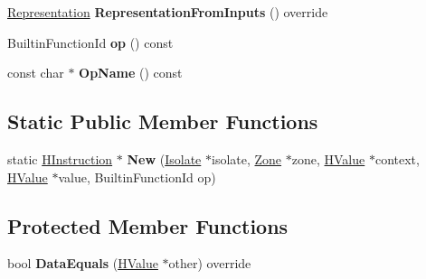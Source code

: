 \begin{DoxyCompactItemize}
\item 
\hyperlink{classv8_1_1internal_1_1_representation}{Representation} {\bfseries Representation\+From\+Inputs} () override\hypertarget{classv8_1_1internal_1_1_h_unary_math_operation_a20d328b4b4449db1e57954efd9edc82b}{}\label{classv8_1_1internal_1_1_h_unary_math_operation_a20d328b4b4449db1e57954efd9edc82b}

\item 
Builtin\+Function\+Id {\bfseries op} () const \hypertarget{classv8_1_1internal_1_1_h_unary_math_operation_ade72a1e96b97be6da0dbab211d5f1c6a}{}\label{classv8_1_1internal_1_1_h_unary_math_operation_ade72a1e96b97be6da0dbab211d5f1c6a}

\item 
const char $\ast$ {\bfseries Op\+Name} () const \hypertarget{classv8_1_1internal_1_1_h_unary_math_operation_a6c257ee25ce97e3b6ea9678a14b773f4}{}\label{classv8_1_1internal_1_1_h_unary_math_operation_a6c257ee25ce97e3b6ea9678a14b773f4}

\end{DoxyCompactItemize}
\subsection*{Static Public Member Functions}
\begin{DoxyCompactItemize}
\item 
static \hyperlink{classv8_1_1internal_1_1_h_instruction}{H\+Instruction} $\ast$ {\bfseries New} (\hyperlink{classv8_1_1internal_1_1_isolate}{Isolate} $\ast$isolate, \hyperlink{classv8_1_1internal_1_1_zone}{Zone} $\ast$zone, \hyperlink{classv8_1_1internal_1_1_h_value}{H\+Value} $\ast$context, \hyperlink{classv8_1_1internal_1_1_h_value}{H\+Value} $\ast$value, Builtin\+Function\+Id op)\hypertarget{classv8_1_1internal_1_1_h_unary_math_operation_a084a2682604ebcef3d614e6096e3f881}{}\label{classv8_1_1internal_1_1_h_unary_math_operation_a084a2682604ebcef3d614e6096e3f881}

\end{DoxyCompactItemize}
\subsection*{Protected Member Functions}
\begin{DoxyCompactItemize}
\item 
bool {\bfseries Data\+Equals} (\hyperlink{classv8_1_1internal_1_1_h_value}{H\+Value} $\ast$other) override\hypertarget{classv8_1_1internal_1_1_h_unary_math_operation_a9c8f609958f5883831cad9c052e92cec}{}\label{classv8_1_1internal_1_1_h_unary_math_operation_a9c8f609958f5883831cad9c052e92cec}

\end{DoxyCompactItemize}
